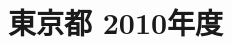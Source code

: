 \documentclass[../../hsm_tok_q.tex]{subfiles}
\begin{document}
    \section{東京都 2010年度}
    \subsection{　}
    
    \newpage
    \subsection{　}
    
    \newpage
    \subsection{　}
    
    \newpage
    \subsection{　}
    
    \newpage
    \subsection{　}
    
\end{document}
